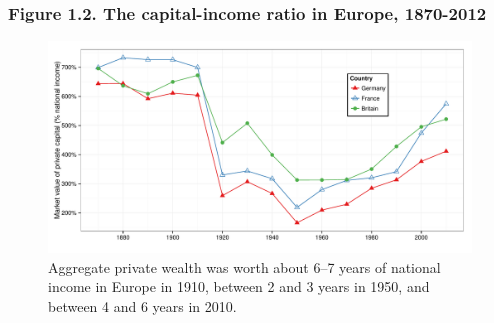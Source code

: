 \documentclass[t]{beamer}\usepackage[]{graphicx}\usepackage[]{color}
\newenvironment{knitrout}{}{} %
\begin{document}
\begin{frame}[label=Figure_1_2,fragile]
\frametitle{Figure 1.2. The capital-income ratio in Europe, 1870-2012}
\begin{figure}[t]
\begin{minipage}[b]{\textwidth}
\centering
\begin{knitrout}\footnotesize
{}\color{fgcolor}

{\centering \includegraphics[width=1\linewidth]{figures/color/Figure_1_2} 

}



\end{knitrout}
\caption{Aggregate private wealth was worth about 6--7 years of national income in Europe in 1910, between 2 and 3 years in 1950, and between 4 and 6 years in 2010.}
\end{minipage}
\end{figure}
\end{frame}
\end{document}
